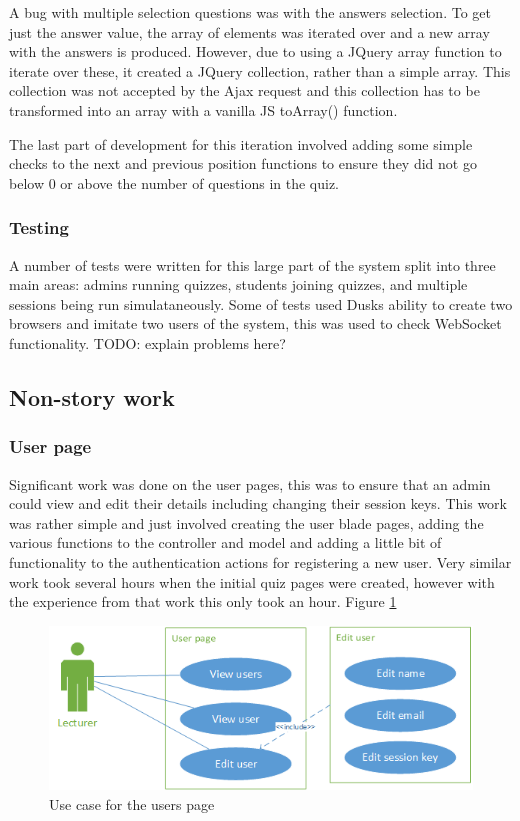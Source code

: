 A bug with multiple selection questions was with the answers selection. To get just the answer value, the array of elements was iterated over and a new array with the answers is produced. However, due to using a JQuery array function to iterate over these, it created a JQuery collection, rather than a simple array. This collection was not accepted by the Ajax request and this collection has to be transformed into an array with a vanilla JS toArray() function.

The last part of development for this iteration involved adding some simple checks to the next and previous position functions to ensure they did not go below 0 or above the number of questions in the quiz.

\subsubsection{Testing}
A number of tests were written for this large part of the system split into three main areas: admins running quizzes, students joining quizzes, and multiple sessions being run simulataneously. Some of tests used Dusks ability to create two browsers and imitate two users of the system, this was used to check WebSocket functionality. TODO: explain problems here?
\newpage

\subsection{Non-story work}
\subsubsection{User page}
Significant work was done on the user pages, this was to ensure that an admin could view and edit their details including changing their session keys. This work was rather simple and just involved creating the user blade pages, adding the various functions to the controller and model and adding a little bit of functionality to the authentication actions for registering a new user. Very similar work took several hours when the initial quiz pages were created, however with the experience from that work this only took an hour. Figure \ref{fig:iter-5-users-use-case}

\begin{figure}
	\caption{Use case for the users page}
	\centerline{\includegraphics{Chapter2/Iter-5/iter-5-users-use-case}}
	\label{fig:iter-5-users-use-case}
\end{figure}

